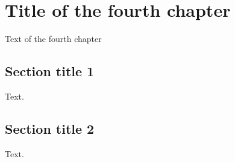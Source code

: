 \chapter{Title of the fourth chapter}
\label{chap:3}

Text of the fourth chapter

\section{Section title 1}
\label{sec:3}

Text.

\section{Section title 2}

Text.

